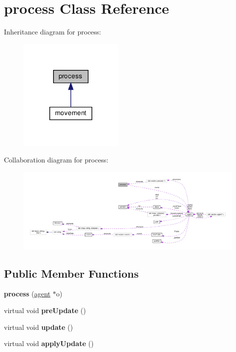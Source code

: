 \hypertarget{classprocess}{}\section{process Class Reference}
\label{classprocess}


Inheritance diagram for process\+:\nopagebreak
\begin{figure}[H]
\begin{center}
\leavevmode
\includegraphics[width=144pt]{classprocess__inherit__graph}
\end{center}
\end{figure}


Collaboration diagram for process\+:\nopagebreak
\begin{figure}[H]
\begin{center}
\leavevmode
\includegraphics[width=350pt]{classprocess__coll__graph}
\end{center}
\end{figure}
\subsection*{Public Member Functions}
\begin{DoxyCompactItemize}
\item 
\mbox{\label{classprocess_ab165eda9f0877f7c9b51b7e8a20090cb}} 
{\bfseries process} (\mbox{\hyperlink{classagent}{agent}} $\ast$o)
\item 
\mbox{\label{classprocess_a01cbd2a12c5ebb9f0d26ab0af1af1698}} 
virtual void {\bfseries pre\+Update} ()
\item 
\mbox{\label{classprocess_a221e8cbecf1f1b241e649db12cbea25f}} 
virtual void {\bfseries update} ()
\item 
\mbox{\label{classprocess_a3c856111d8e7c3e123ffb826ed1c4cd1}} 
virtual void {\bfseries apply\+Update} ()
\end{DoxyCompactItemize}
